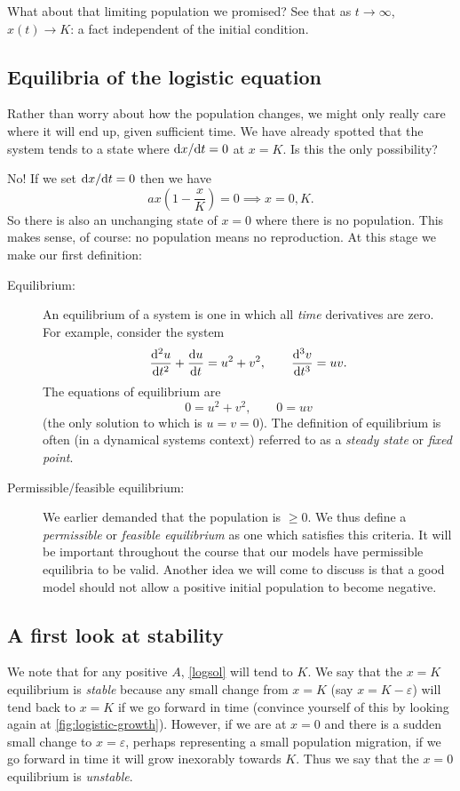 \documentclass[12pt,a4paper,openany,twoside]{book}
\renewcommand{\d}{{\mathrm d}}
\newcommand{\fd}[2]{\mathchoice{\frac{\d #1}{\d #2}}{\d #1/\d #2}{\d #1/\d #2}{\d #1/\d #2}}
\newcommand{\fdd}[2]{\mathchoice{\frac{\d^2 #1}{\d #2^2}}{\d^2 #1/\d #2^2}{\d^2 #1/\d #2^2}{\d^2 #1/\d #2^2}}
\newcommand{\fdn}[3]{\mathchoice{\frac{\d^{#1} #2}{\d #3^{#1}}}{\d^{#1} #2/\d #3^{#1}}{\d^{#1} #2/\d #3^{#1}}{\d^{#1} #2/\d #3^{#1}}}
\newcommand{\ep}{\varepsilon} %
\begin{document}
What about that limiting population we promised? See that as $t \to \infty$, $x(t) \to K$: a fact independent of the initial condition.


\subsection{Equilibria of the logistic equation}
Rather than worry about how the population changes, we might only really care where it will end up, given sufficient time. We have already spotted that the system tends to a state where $\fd{x}{t}=0$ at $x=K$. Is this the only possibility? 

No! If we set $\fd{x}{t}=0$ then we have
\begin{equation}
	a x\left(1-\frac{x}{K}\right) = 0 \implies x=0, K.
\end{equation}
So there is also an unchanging state of $x=0$ where there is no population. This makes sense, of course: no population means no reproduction.  At this stage we make our first definition:

\begin{description}
	\item[Equilibrium:] An equilibrium of a system is one in which all \emph{time} derivatives are zero. For example, consider the system
	\begin{equation}
		\fdd{u}{t}  + \fd{u}{t} = u^2+v^2,\qquad \fdn{3}{v}{t} = uv.
	\end{equation}
	The equations of equilibrium are
	\begin{equation}
		0 = u^2+v^2,\qquad  0 = uv
	\end{equation}
	(the only solution to which is $u=v=0$). The definition of equilibrium is often (in a dynamical systems context) referred to as a \emph{steady state} or \emph{fixed point}.
	
	\item[Permissible/feasible equilibrium:]
	We earlier demanded that the population is $\geq 0$. We thus define a \emph{permissible} or \emph{feasible equilibrium} as one which satisfies this criteria. It will be important throughout the course that our models have permissible equilibria to be valid. Another idea we will come to discuss is that a good model should not allow a positive initial population to become negative.
\end{description}

\subsection{A first look at stability}
We note that for any positive $A$, \cref{logsol} will tend to $K$. We say that the $x=K$ equilibrium is \emph{stable} because any small change from $x=K$ (say $x= K-\ep$) will tend back to $x=K$ if we go forward in time (convince yourself of this by looking again at \cref{fig:logistic-growth}). However, if we are at $x=0$ and there is a sudden small change to  $x=\ep$, perhaps representing a small population migration, if we go forward in time it will grow inexorably towards $K$. Thus we say that the $x=0$ equilibrium is \emph{unstable}. 
\end{document}
